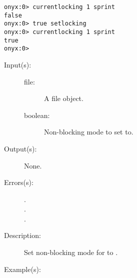 \begin{description}
\begin{description}
\begin{verbatim}
onyx:0> currentlocking 1 sprint
false
onyx:0> true setlocking
onyx:0> currentlocking 1 sprint
true
onyx:0>
		\end{verbatim}
	\end{description}
\label{systemdict:setnonblocking}
\item[{\onyxop{file boolean}{setnonblocking}{--}}: ]
	\begin{description}\item[]
	\item[Input(s): ]
		\begin{description}\item[]
		\item[file: ]
			A file object.
		\item[boolean: ]
			Non-blocking mode to set  to.
		\end{description}
	\item[Output(s): ] None.
	\item[Errors(s): ]
		\begin{description}\item[]
		\item[.]
		\item[.]
		\item[.]
		\end{description}
	\item[Description: ]
		Set non-blocking mode for  to .
	\item[Example(s): ]\begin{verbatim}


\end{verbatim}
\end{description}
\end{description}
